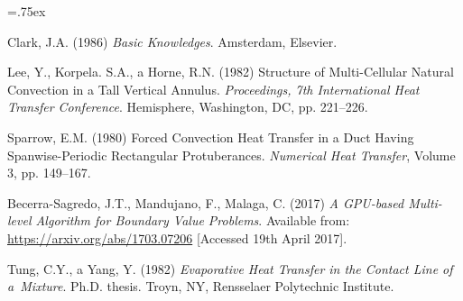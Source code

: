 \documentclass{template_svk}
\begin{document}


\begin{thebibliography}{99}\itemsep=.75ex%

Clark, J.A. (1986) {\em Basic Knowledges}. Amsterdam, Elsevier.

Lee, Y., Korpela. S.A., a Horne, R.N. (1982) Structure of Multi-Cellular
Natural Convection in a Tall Vertical Annulus. {\it Proceedings, 7th
International Heat Transfer Conference}. Hemisphere, Washington, DC,
pp. 221--226.

Sparrow, E.M. (1980) Forced Convection Heat Transfer in a
Duct Having Spanwise-Periodic Rectangular Protuberances. {\it Numerical Heat
Transfer}, Volume 3, pp. 149--167.

Becerra-Sagredo, J.T., Mandujano, F., Malaga, C. (2017) {\it A GPU-based
Multi-level Algorithm for Boundary Value Problems}.
Available from: \url{https://arxiv.org/abs/1703.07206}
[Accessed 19th April 2017].

Tung, C.Y., a Yang, Y. (1982) {\it Evaporative Heat Transfer in the Contact
Line of a~Mixture}. Ph.D. thesis. Troyn, NY, Rensselaer Polytechnic Institute.

\end{thebibliography}
\end{document}
